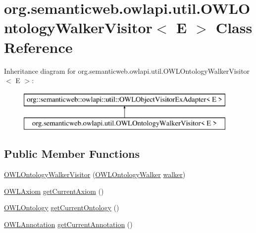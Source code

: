 \hypertarget{classorg_1_1semanticweb_1_1owlapi_1_1util_1_1_o_w_l_ontology_walker_visitor_3_01_e_01_4}{\section{org.\-semanticweb.\-owlapi.\-util.\-O\-W\-L\-Ontology\-Walker\-Visitor$<$ E $>$ Class Reference}
\label{classorg_1_1semanticweb_1_1owlapi_1_1util_1_1_o_w_l_ontology_walker_visitor_3_01_e_01_4}
}
Inheritance diagram for org.\-semanticweb.\-owlapi.\-util.\-O\-W\-L\-Ontology\-Walker\-Visitor$<$ E $>$\-:\begin{figure}[H]
\begin{center}
\leavevmode
\includegraphics[height=2.000000cm]{classorg_1_1semanticweb_1_1owlapi_1_1util_1_1_o_w_l_ontology_walker_visitor_3_01_e_01_4}
\end{center}
\end{figure}
\subsection*{Public Member Functions}
\begin{DoxyCompactItemize}
\item 
\hyperlink{classorg_1_1semanticweb_1_1owlapi_1_1util_1_1_o_w_l_ontology_walker_visitor_3_01_e_01_4_a002a186cc593362bbc775bb5e7326366}{O\-W\-L\-Ontology\-Walker\-Visitor} (\hyperlink{classorg_1_1semanticweb_1_1owlapi_1_1util_1_1_o_w_l_ontology_walker}{O\-W\-L\-Ontology\-Walker} \hyperlink{classorg_1_1semanticweb_1_1owlapi_1_1util_1_1_o_w_l_ontology_walker_visitor_3_01_e_01_4_a4602780c5c01f1667d5f4fb9ae16bec6}{walker})
\item 
\hyperlink{interfaceorg_1_1semanticweb_1_1owlapi_1_1model_1_1_o_w_l_axiom}{O\-W\-L\-Axiom} \hyperlink{classorg_1_1semanticweb_1_1owlapi_1_1util_1_1_o_w_l_ontology_walker_visitor_3_01_e_01_4_ad3786795d6cd53eb98f66a8988a231c2}{get\-Current\-Axiom} ()
\item 
\hyperlink{interfaceorg_1_1semanticweb_1_1owlapi_1_1model_1_1_o_w_l_ontology}{O\-W\-L\-Ontology} \hyperlink{classorg_1_1semanticweb_1_1owlapi_1_1util_1_1_o_w_l_ontology_walker_visitor_3_01_e_01_4_a053ad7c390a7adf75749e98588e040c6}{get\-Current\-Ontology} ()
\item 
\hyperlink{interfaceorg_1_1semanticweb_1_1owlapi_1_1model_1_1_o_w_l_annotation}{O\-W\-L\-Annotation} \hyperlink{classorg_1_1semanticweb_1_1owlapi_1_1util_1_1_o_w_l_ontology_walker_visitor_3_01_e_01_4_a28118a8d61b6759fbc04c787cab2b1a1}{get\-Current\-Annotation} ()
\end{DoxyCompactItemize}
